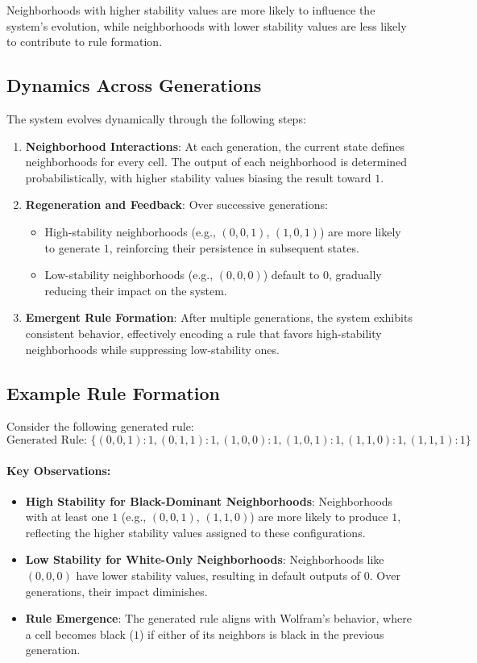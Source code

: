 \documentclass[entropy,article,submit,pdftex,moreauthors]{Definitions/mdpi}
\begin{document}
Neighborhoods with higher stability values are more likely to influence the system's evolution, while neighborhoods with lower stability values are less likely to contribute to rule formation.

\subsection{Dynamics Across Generations}

The system evolves dynamically through the following steps:
\begin{enumerate}
    \item \textbf{Neighborhood Interactions}: At each generation, the current state defines neighborhoods for every cell. The output of each neighborhood is determined probabilistically, with higher stability values biasing the result toward \(1\).
    \item \textbf{Regeneration and Feedback}: Over successive generations:
    \begin{itemize}
        \item High-stability neighborhoods (e.g., \((0, 0, 1)\), \((1, 0, 1)\)) are more likely to generate \(1\), reinforcing their persistence in subsequent states.
        \item Low-stability neighborhoods (e.g., \((0, 0, 0)\)) default to \(0\), gradually reducing their impact on the system.
    \end{itemize}
    \item \textbf{Emergent Rule Formation}: After multiple generations, the system exhibits consistent behavior, effectively encoding a rule that favors high-stability neighborhoods while suppressing low-stability ones.
\end{enumerate}

\subsection{Example Rule Formation}

Consider the following generated rule:
\[
\text{Generated Rule: } \{(0, 0, 1): 1, (0, 1, 1): 1, (1, 0, 0): 1, (1, 0, 1): 1, (1, 1, 0): 1, (1, 1, 1): 1\}
\]

\paragraph{Key Observations:}
\begin{itemize}
    \item \textbf{High Stability for Black-Dominant Neighborhoods}: Neighborhoods with at least one \(1\) (e.g., \((0, 0, 1)\), \((1, 1, 0)\)) are more likely to produce \(1\), reflecting the higher stability values assigned to these configurations.
    \item \textbf{Low Stability for White-Only Neighborhoods}: Neighborhoods like \((0, 0, 0)\) have lower stability values, resulting in default outputs of \(0\). Over generations, their impact diminishes.
    \item \textbf{Rule Emergence}: The generated rule aligns with Wolfram’s behavior, where a cell becomes black (\(1\)) if either of its neighbors is black in the previous generation.
\end{itemize}
\end{document}
